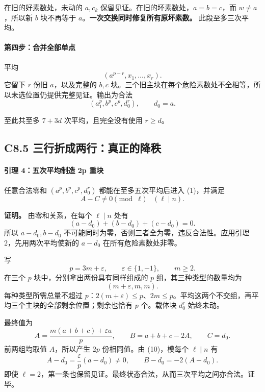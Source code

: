\documentclass[11pt,a4paper]{article}
\theoremstyle{definition}
\numberwithin{equation}{section}
\begin{document}
{在旧的好素数处，未动的} \(a,c_k\) {保留见证。在旧的坏素数处，}\(a=b=c\){，而} \(w\ne a\){，所以新} \(b\) {块不再等于} \(a\){。}\textbf{{一次交换同时修复所有原坏素数。}} {此段至多三次平均。}

\paragraph*{\texorpdfstring{{第四步：合并全部单点}}{第四步：合并全部单点}}\label{C8-h55}

{平均} \[
(a^{p-r},x_1,\ldots,x_r).
\] {它留下} \(r\) {份旧} \(a\){，以及完整的} \(b,c\) {块。三个旧主块在每个危险素数处不全相等，所以未选位置仍提供完整见证。输出为合法} \[
(a_1^p,b^p,c^p,d_0^r),\qquad d_0=a.
\tag{C8.8}
\]

{至此共至多} \(7+3d\) {次平均，且完全没有使用} \(r\ge d\){。}

\subsection*{\texorpdfstring{{C8.5} {三行折成两行：真正的降秩}}{C8.5 三行折成两行：真正的降秩}}\label{C8-h56}

\paragraph*{\texorpdfstring{{引理} {4：五次平均制造} {2p} {重块}}{引理 4：五次平均制造 2p 重块}}\label{C8-h57}

{任意合法零和} \((a^p,b^p,c^p,d_0^r)\) {都能在至多五次平均后进入} {(1)，并满足} \[
A-C\ne0\pmod\ell\quad(\ell\mid n).
\tag{C8.9}
\]

\textbf{{证明。}} {由零和关系，在每个} \(\ell\mid n\) {处有} \[
(a-d_0)+(b-d_0)+(c-d_0)=0.
\tag{C8.10}
\] {所以} \(a-d_0,b-d_0\) {不可能同时为零，否则三者全为零，违反合法性。应用引理} {2，先用两次平均使新的} \(a-d_0\) {在所有危险素数处非零。}

{写} \[
p=3m+\varepsilon,\qquad \varepsilon\in\{1,-1\},\qquad m\ge2.
\] {在三个} \(p\) {块中，分别拿出两份具有同样组成的} \(p\) {组，其三种类型的数量均为} \[
(m+\varepsilon,m,m).
\tag{C8.11}
\] {每种类型所需总量不超过} \(p\){：}\(2(m+\varepsilon)\le p\){、}\(2m\le p\){。平均这两个不交组，再平均三个主块的全部剩余位置；剩余也恰有} \(p\) {个。载体块} \(d_0^r\) {始终未动。}

{最终值为} \[
A=\frac{m(a+b+c)+\varepsilon a}{p},\qquad
B=a+b+c-2A,\qquad C=d_0.
\tag{C8.12}
\] {前两组均取值} \(A\){，所以产生} \(2p\) {份相同值。由} {(10)，模每个} \(\ell\mid n\) {有} \[
A-d_0=\frac\varepsilon p(a-d_0)\ne0,\qquad
B-d_0=-2(A-d_0).
\tag{C8.13}
\] {即使} \(\ell=2\){，第一条也保留见证。最终状态合法，从而三次平均之间亦合法。证毕。}
\end{document}
